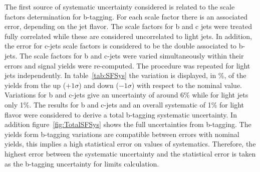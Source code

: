 The first source of systematic uncertainty considered is related to the scale factors determination for b-tagging. For each scale factor there is an associated error, depending on the jet flavor. The scale factors for b and c jets were treated fully correlated while these are considered uncorrelated to light jets. In addition, the error for c-jets scale factors is considered to be the double associated to b-jets. The scale factors for b and c-jets were varied simultaneously within their errors and signal yields were re-computed. The procedure was repeated for light jets independently. In table~\ref{tab:SFSys} the variation is displayed, in \%, of the yields from the up ($+1\sigma$) and down ($-1\sigma$) with respect to the nominal value. Variations for b and c-jets give an uncertainty of around 6\% while for light jets only 1\%. The results for b and c-jets and an overall systematic of 1\% for light flavor were considered to derive a total b-tagging systematic uncertainty. In addition figure~\ref{fig:TotalSFSys} shows the full uncertainties from b-tagging. The yields form b-tagging variations are compatible between errors with nominal yields, this implies a high statistical error on values of systematics. Therefore, the highest error between the systematic uncertainty and the statistical error is taken as the b-tagging uncertainty for limits calculation.

\begin{table*}[htbH]
\begin{center}
\caption{B-tagging uncertainties for signal samples\label{tab:SFSys}}
\end{center}
\end{table*}

